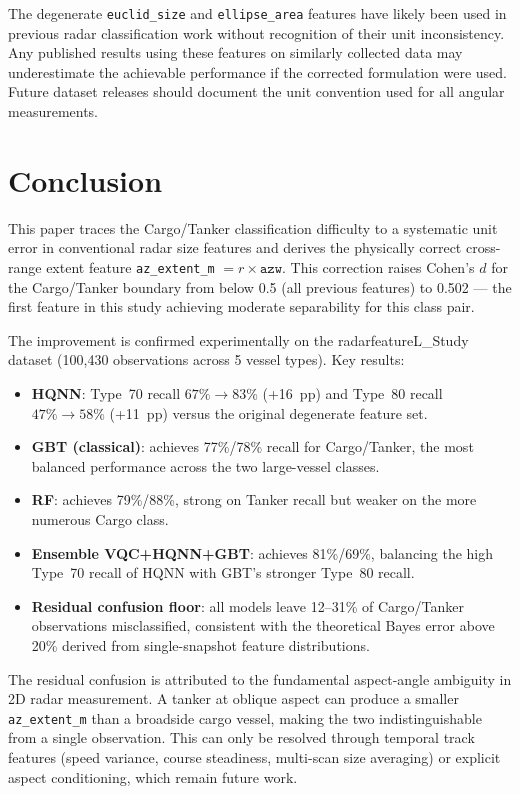 \documentclass[journal]{IEEEtran}
\begin{document}
The degenerate \texttt{euclid\_size} and \texttt{ellipse\_area} features have
likely been used in previous radar classification work without recognition of
their unit inconsistency. Any published results using these features on
similarly collected data may underestimate the achievable performance if the
corrected formulation were used. Future dataset releases should document
the unit convention used for all angular measurements.

\section{Conclusion}

This paper traces the Cargo/Tanker classification difficulty to a systematic
unit error in conventional radar size features and derives the physically correct
cross-range extent feature \texttt{az\_extent\_m} $= r \times \texttt{azw}$.
This correction raises Cohen's $d$ for the Cargo/Tanker boundary from below 0.5
(all previous features) to 0.502 — the first feature in this study achieving
moderate separability for this class pair.

The improvement is confirmed experimentally on the radarfeatureL\_Study dataset
(100,430 observations across 5 vessel types). Key results:
\begin{itemize}
  \item \textbf{HQNN}: Type~70 recall $67\% \to 83\%$ (+16~pp) and Type~80
        recall $47\% \to 58\%$ (+11~pp) versus the original degenerate feature set.
  \item \textbf{GBT (classical)}: achieves 77\%/78\% recall for Cargo/Tanker,
        the most balanced performance across the two large-vessel classes.
  \item \textbf{RF}: achieves 79\%/88\%, strong on Tanker recall but weaker
        on the more numerous Cargo class.
  \item \textbf{Ensemble VQC+HQNN+GBT}: achieves 81\%/69\%, balancing the
        high Type~70 recall of HQNN with GBT's stronger Type~80 recall.
  \item \textbf{Residual confusion floor}: all models leave 12--31\% of
        Cargo/Tanker observations misclassified, consistent with the theoretical
        Bayes error above 20\% derived from single-snapshot feature distributions.
\end{itemize}

The residual confusion is attributed to the fundamental aspect-angle ambiguity
in 2D radar measurement. A tanker at oblique aspect can produce a smaller
\texttt{az\_extent\_m} than a broadside cargo vessel, making the two
indistinguishable from a single observation. This can only be resolved through
temporal track features (speed variance, course steadiness, multi-scan size
averaging) or explicit aspect conditioning, which remain future work.
\end{document}
